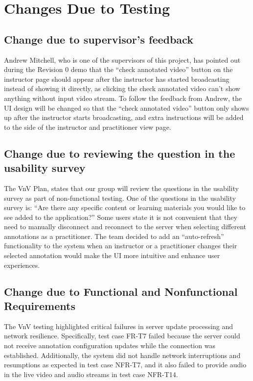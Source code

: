 \documentclass[12pt, titlepage]{article}
\begin{document}
\section{Changes Due to Testing}

\subsection{Change due to supervisor's feedback}
Andrew Mitchell, who is one of the supervisors of this project, has pointed out during the Revision 0 demo that the “check annotated video” button on the instructor page should appear after the instructor has started broadcasting instead of showing it directly, as clicking the check annotated video can’t show anything without input video stream. To follow the feedback from Andrew, the UI design will be changed so that the “check annotated video” button only shows up after the instructor starts broadcasting, and extra instructions will be added to the side of the instructor and practitioner view page.

\subsection{Change due to reviewing the question in the usability survey}
The VnV Plan, states that our group will review the questions in the usability survey as part of non-functional testing. One of the questions in the usability survey is: “Are there any specific content or learning materials you would like to see added to the application?” Some users state it is not convenient that they need to manually disconnect and reconnect to the server when selecting different annotations as a practitioner. The team decided to add an “auto-refresh” functionality to the system when an instructor or a practitioner changes their selected annotation would make the UI more intuitive and enhance user experiences.

\subsection{Change due to Functional and Nonfunctional Requirements}
The VnV testing highlighted critical failures in server update processing and network resilience. Specifically, test case FR-T7 failed because the server could not receive annotation configuration updates while the connection was established. Additionally, the system did not handle network interruptions and resumptions as expected in test case NFR-T7, and it also failed to provide audio in the live video and audio streams in test case NFR-T14.
\end{document}
